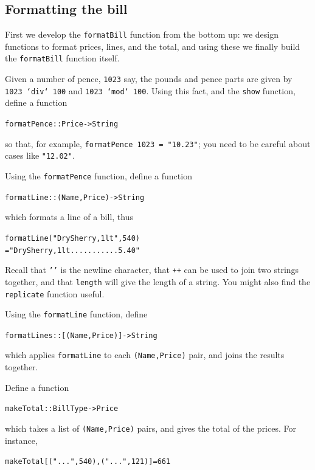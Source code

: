 \subsection*{Formatting the bill}
 
First we develop the \texttt{formatBill} function from
the bottom up: we design functions to format prices, lines, and the total, and
using these we finally build the \texttt{formatBill} function itself.

\begin{exercises}

\item
Given a number of pence, \texttt{1023} say, the pounds and pence parts are given
by \texttt{1023 `div` 100} and \texttt{1023 `mod` 100}. Using this fact, and the 
\texttt{show} function, define a function
\begin{alltt}
formatPence :: Price -> String
\end{alltt}
so that, for example, \texttt{formatPence 1023 = "10.23"}; you need to be
careful about cases like \texttt{"12.02"}.

\item
Using the \texttt{formatPence} function, define a function
\begin{alltt}
formatLine  :: (Name,Price) -> String
\end{alltt}
which formats a line of a bill, thus
\begin{alltt}
formatLine ("Dry Sherry, 1lt",540) 
               = "Dry Sherry, 1lt...........5.40"
\end{alltt}
Recall that \texttt{''} is the newline character, 
that \texttt{++} can be used
to join two strings together, and that \texttt{length} will give the length of a
string. You might also find the \texttt{replicate} function useful.

\item
Using the \texttt{formatLine} function, define
\begin{alltt}
formatLines :: [ (Name,Price) ] -> String
\end{alltt}
which applies \texttt{formatLine} to each \texttt{(Name,Price)} pair, and joins the
results together. 

\item
Define a function 
\begin{alltt}
makeTotal :: BillType -> Price
\end{alltt}
which takes a list of \texttt{(Name,Price)} pairs, and gives the total of the
prices. For instance,
\begin{alltt}
makeTotal [(" ... ",540),(" ... ",121)] = 661
\end{alltt}


\end{exercises}
